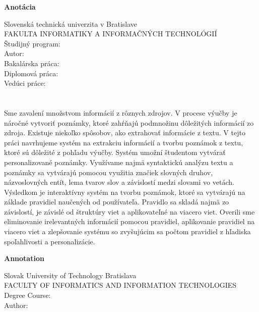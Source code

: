 \newpage
\thispagestyle{plain}
\begin{center}
\begin{Large}
\textbf{Anotácia} \\
\end{Large}
\end{center}
Slovenská technická univerzita v Bratislave \\
FAKULTA INFORMATIKY A INFORMAČNÝCH TECHNOLÓGIÍ \\
\noindent
Študijný program: \Program \\
\noindent
Autor: \Author \\
{
	{Bakalárska práca: }\Title \\
}
{
	{Diplomová práca: }\Title \\
}
Vedúci práce: \Supervisor \\
\Month \Year \\
\noindent
\\
Sme zavalení množstvom informácií z rôznych zdrojov. V procese výučby je náročné vytvoriť poznámky, ktoré zahŕňajú podmnožinu dôležitých informácií zo zdroja. Existuje niekoľko spôsobov, ako extrahovať informácie z textu. V tejto práci navrhujeme systém na extrakciu informácií a tvorbu poznámok z textu, ktoré sú dôležité z pohľadu výučby. Systém umožní študentom vytvárať personalizované poznámky. Využívame najmä syntaktickú analýzu textu a poznámky sa vytvárajú pomocou využitia značiek slovných druhov, názvoslovných entít, lema tvarov slov a závislostí medzi slovami vo vetách. Výsledkom je interaktívny systém na tvorbu poznámok, ktoré sa vytvárajú na základe pravidiel naučených od používateľa. Pravidlo sa skladá najmä zo závislostí, je závislé od štruktúry viet a aplikovateľné na viacero viet. Overili sme eliminovanie irelevantných informácií pomocou pravidiel, aplikovanie pravidiel na viacero viet a zlepšovanie systému so zvyšujúcim sa počtom pravidiel z hľadiska spoľahlivosti a personalizácie.
\newpage
\thispagestyle{plain}
\begin{center}
\begin{Large}
\textbf{Annotation} \\
\end{Large}
\end{center}
Slovak University of Technology Bratislava \\
FACULTY OF INFORMATICS AND INFORMATION TECHNOLOGIES \\
\noindent
Degree Course: \Program \\
\noindent
Author: \Author \\

